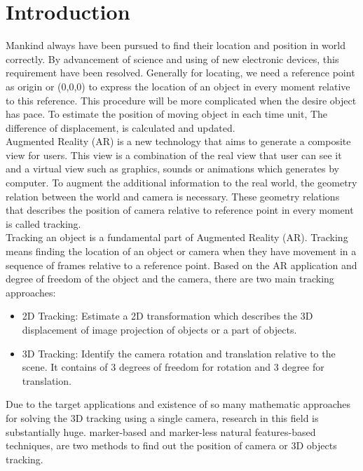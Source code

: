 \chapter{Introduction}\label{chapter:introduction}

Mankind always have been pursued to find their location and position in world correctly. By advancement of science and using of new electronic devices, this requirement have been resolved. Generally for locating, we need a reference point as origin or (0,0,0) to express the location of an object in every moment relative to this reference. This procedure will be more complicated when the desire object has pace. To estimate the position of moving object in each time unit, The difference of displacement, is calculated and updated.\\
Augmented Reality (AR) is a new technology that aims to generate a composite view for users. This view is a combination of the real view that user can see it and a virtual view such as graphics, sounds or animations which generates by computer. To augment the additional information to the real world, the geometry relation between the world and camera is necessary. These geometry relations that describes the position of camera relative to reference point in every moment is called tracking.\\
Tracking an object is a fundamental part of Augmented Reality (AR). Tracking means finding the location of an object or camera when they have movement in a sequence of frames relative to a reference point. Based on the AR application and degree of freedom of the object and the camera, there are two main tracking approaches:

\begin{itemize}
\item 2D Tracking: Estimate a 2D transformation which describes the 3D displacement of image projection of objects or a part of objects.
\item 3D Tracking: Identify the camera rotation and translation relative to the scene. It contains of 3 degrees of freedom for rotation and 3 degree for translation.
\end{itemize}

Due to the target applications and existence of so many mathematic approaches for solving the 3D tracking using a single camera, research in this field is substantially huge. marker-based and marker-less natural features-based techniques, are two methods to find out the position of camera or 3D objects tracking.\\

